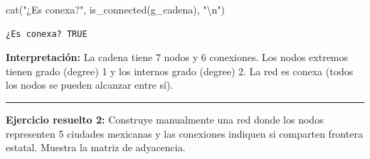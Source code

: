 \documentclass[
  letterpaper,
  DIV=11,
  numbers=noendperiod]{scrreprt}
\newenvironment{Shaded}{\begin{snugshade}}{\end{snugshade}}
\newcommand{\FunctionTok}[1]{\textcolor[rgb]{0.28,0.35,0.67}{#1}}
\newcommand{\NormalTok}[1]{\textcolor[rgb]{0.00,0.23,0.31}{#1}}
\newcommand{\SpecialCharTok}[1]{\textcolor[rgb]{0.37,0.37,0.37}{#1}}
\newcommand{\StringTok}[1]{\textcolor[rgb]{0.13,0.47,0.30}{#1}}
\begin{document}
\begin{tcolorbox}
\begin{Shaded}
\begin{Highlighting}[]
\FunctionTok{cat}\NormalTok{(}\StringTok{"¿Es conexa?"}\NormalTok{, }\FunctionTok{is\_connected}\NormalTok{(g\_cadena), }\StringTok{"}\SpecialCharTok{\textbackslash{}n}\StringTok{"}\NormalTok{)}
\end{Highlighting}
\end{Shaded}

\begin{verbatim}
¿Es conexa? TRUE 
\end{verbatim}

\textbf{Interpretación:} La cadena tiene 7 nodos y 6 conexiones. Los
nodos extremos tienen grado (degree) 1 y los internos grado (degree) 2.
La red es conexa (todos los nodos se pueden alcanzar entre sí).

\end{tcolorbox}

\begin{center}\rule{0.5\linewidth}{0.5pt}\end{center}

\textbf{Ejercicio resuelto 2:} Construye manualmente una red donde los
nodos representen 5 ciudades mexicanas y las conexiones indiquen si
comparten frontera estatal. Muestra la matriz de adyacencia.
\end{document}
